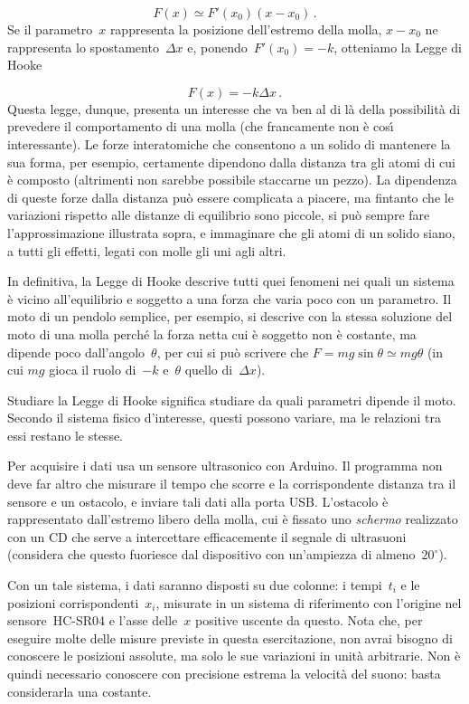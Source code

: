 \documentclass[12pt, a4paper]{physathome}   	%
\begin{document}
\begin{equation}
F(x) \simeq F'(x_0)\left(x-x_0\right)\,.
\end{equation}
Se il parametro~$x$ rappresenta la posizione dell'estremo della molla, $x-x_0$ ne rappresenta lo spostamento~$\Delta x$ e, ponendo~$F'(x_0) = -k$, otteniamo la Legge di Hooke

\begin{equation}
F(x) = -k\Delta x\,.
\end{equation}
Questa legge, dunque, presenta un interesse che va ben al di l\`a della possibilit\`a di prevedere il comportamento di una molla (che francamente non \`e cos\'\i{} interessante). Le forze interatomiche che consentono a un solido di mantenere la sua forma, per esempio, certamente dipendono dalla distanza tra gli atomi di cui \`e composto (altrimenti non sarebbe possibile staccarne un pezzo). La dipendenza di queste forze dalla distanza pu\`o essere complicata a piacere, ma fintanto che le variazioni rispetto alle distanze di equilibrio sono piccole, si pu\`o sempre fare l'approssimazione illustrata sopra, e immaginare che gli atomi di un solido siano, a tutti gli effetti, legati con molle gli uni agli altri. 

In definitiva, la Legge di Hooke descrive tutti quei fenomeni nei quali un sistema \`e vicino all'equilibrio e soggetto a una forza che varia poco con un parametro. Il moto di un pendolo semplice, per esempio, si descrive con la stessa soluzione del moto di una molla perch\'e la forza netta cui \`e soggetto non \`e costante, ma dipende poco dall'angolo~$\theta$, per cui si pu\`o scrivere che $F=mg\sin\theta\simeq mg\theta$ (in cui $mg$ gioca il ruolo di~$-k$ e~$\theta$ quello di~$\Delta x$).

Studiare la Legge di Hooke significa studiare da quali parametri dipende il moto. Secondo il sistema fisico d'interesse, questi possono variare, ma le relazioni tra essi restano le stesse.

Per acquisire i dati usa un sensore ultrasonico con Arduino. Il programma non deve far altro che misurare il tempo che scorre e la corrispondente distanza tra il sensore e un ostacolo, e inviare tali dati alla porta USB. L'ostacolo \`e rappresentato dall'estremo libero della molla, cui \`e fissato uno {\em schermo} realizzato con un CD che serve a intercettare efficacemente il segnale di ultrasuoni (considera che questo fuoriesce dal dispositivo con un'ampiezza di almeno~$20^\circ$).

Con un tale sistema, i dati saranno disposti su due colonne: i tempi~$t_i$ e le posizioni corrispondenti~$x_i$, misurate in un sistema di riferimento con l'origine nel sensore~HC-SR04 e l'asse delle~$x$ positive uscente da questo. Nota che, per eseguire molte delle misure previste in questa esercitazione, non avrai bisogno di conoscere le posizioni assolute, ma solo le sue variazioni in unit\`a arbitrarie. Non \`e quindi necessario conoscere con precisione estrema la velocit\`a del suono: basta considerarla una costante.
\end{document}
